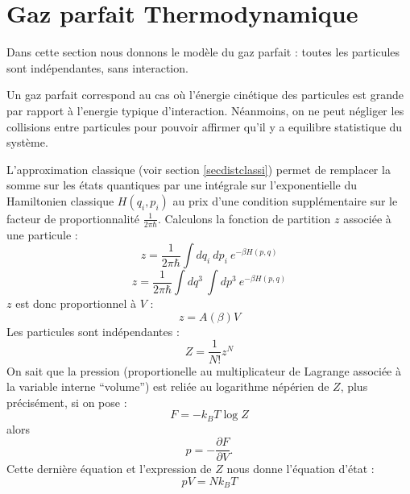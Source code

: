\documentclass[12pt]{book}
\begin{document}
\section{Gaz parfait Thermodynamique}\label{secgazparfthe}
Dans cette section nous donnons le mod\`ele du gaz parfait : toutes
les particules sont ind\'ependantes, sans interaction.
\begin{rem}
Un gaz parfait correspond au cas o\`u l'\'energie cin\'etique des
particules est grande par rapport \`a l'energie typique d'interaction.
N\'eanmoins, on ne peut n\'egliger les collisions entre particules
pour pouvoir affirmer qu'il y a equilibre statistique du syst\`eme.
\end{rem}
L'approximation classique (voir section \ref{secdistclassi}) 
permet de remplacer la somme sur les
\'etats quantiques par une int\'egrale  sur l'exponentielle du
Hamiltonien classique $H(q_i,p_i)$ au prix d'une condition
suppl\'ementaire sur le 
facteur de proportionnalit\'e $\frac{1}{2\pi \hbar}$.
Calculons la fonction de partition $z$ associ\'ee \`a une particule :
\begin{equation}
z=\frac{1}{2\pi \hbar}\int dq_i\ dp_i\ e^{-\beta H(p,q)}
\end{equation}
\begin{equation}
z=\frac{1}{2\pi \hbar}\int dq^3\ \int dp^3\ e^{-\beta H(p,q)}
\end{equation}
$z$ est donc proportionnel \`a $V$ :
\begin{equation}
z=A(\beta) V
\end{equation}
Les particules sont ind\'ependantes :
\begin{equation}
Z=\frac{1}{N!}z^N
\end{equation}
On sait que la pression (proportionelle au multiplicateur de Lagrange
associ\'ee \`a la variable interne ``volume'') est reli\'ee au
logarithme n\'ep\'erien de $Z$, plus pr\'ecis\'ement, si on pose :
\begin{equation}
F=-k_BT\log Z
\end{equation}
alors
\begin{equation}
p=-\frac{\partial F}{\partial V}.
\end{equation}
Cette derni\`ere \'equation et l'expression de $Z$ nous donne
l'\'equation d'\'etat :
\begin{equation}
pV=Nk_BT
\end{equation}
\end{document}
